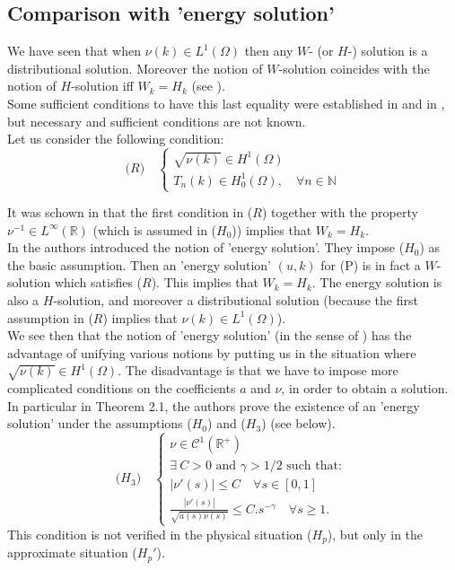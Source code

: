 \documentclass{elsart}
\begin{document}
\subsection*{Comparison with 'energy solution'}

We have seen that when $\nu(k)\in L^1(\Omega)$ then any $W$- (or $H$-)
solution is a distributional solution. Moreover the notion of
$W$-solution coincides with the notion of $H$-solution iff
$W_k=H_k$ (see \cite{zhikov}). \\ 

Some sufficient conditions to have this last equality were established
in \cite{zhikov} and in \cite{gal}, but necessary and sufficient conditions
are not known. \\ 

Let us consider the following condition: 
$$
\text{($R$)}  \quad\left\{
	\begin{array}{l}
	  \sqrt{\nu(k)} \in H^1(\Omega) \\ 
	  T_n(k) \in H^1_0(\Omega), \quad \forall n \in \mathbb N
	  \end{array}
	\right.
$$

It was schown in \cite{gal} that the first condition in ($R$) together
with the property $\nu^{-1} \in L^{\infty}(\mathbb R)$ (which is
assumed in ($H_0$)) implies that $W_k=H_k$. \\ 

In \cite{gal} the authors introduced the notion of 'energy
solution'. They impose ($H_0$) as the basic assumption. Then an 
'energy solution' $(u,k)$ for (P) is in fact a $W$-solution which
satisfies ($R$). This implies that $W_k=H_k$. The energy solution is 
also a $H$-solution, and moreover a distributional solution (because the
first assumption in ($R$) implies that $\nu(k)\in L^1(\Omega)$). \\ 

We see then that the notion of 'energy solution' (in the sense of
\cite{gal}) has the advantage of 
unifying various notions by putting us in the situation where 
$\sqrt{\nu(k)}\in H^1(\Omega)$. The disadvantage is that we have to
impose more complicated conditions on the coefficients $a$ and $\nu$,
in order to obtain a solution. In particular in \cite{gal} Theorem 2.1, 
the authors prove the existence of an 'energy solution' under the
assumptions ($H_0$) and ($H_3$) (see below).
$$
\text{($H_3$)}  \quad\left\{
	\begin{array}{l}
	  \nu \in \mathcal{C}^1(\mathbb R^{+}) \\
	  \exists \ C > 0 \text{ and } \gamma > 1/2 \text{ such that: }\\ 
	  |\nu'(s)| \leq C \quad \forall s \in [0,1] \\ 
	  \frac{|\nu'(s)|}{\sqrt{a(s)\nu(s)}} \leq C.s^{-\gamma} \quad
	  \forall s \geq 1.	  
	\end{array}
	\right.
$$
This condition is not verified in the physical situation ($H_p$), but
only in the approximate situation ($H_p'$).
\\ 
\end{document}
